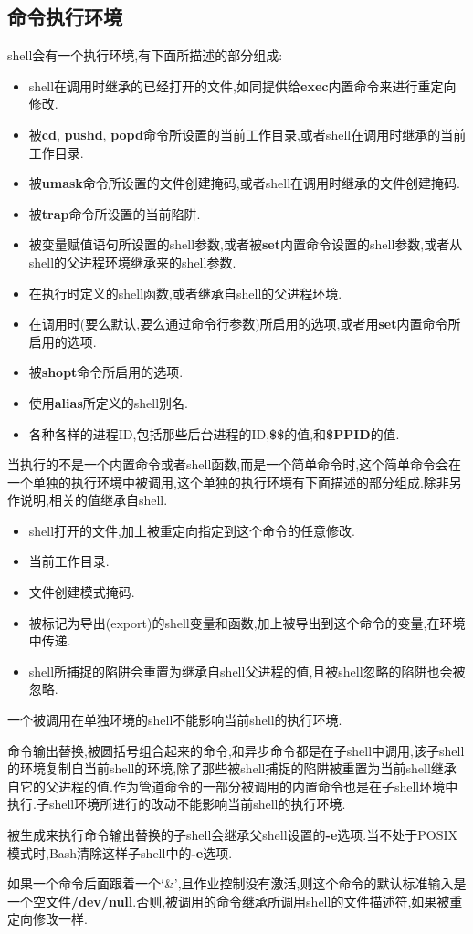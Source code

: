 \documentclass[draft,openany]{book}
\begin{document}
\begin{CJK}{UTF8}{gbsn}
    \subsection{命令执行环境}
    shell会有一个执行环境,有下面所描述的部分组成:
    \begin{itemize}
        \item shell在调用时继承的已经打开的文件,如同提供给\textbf{exec}内置命令来进行重定向修改.
        \item 被\textbf{cd}, \textbf{pushd}, \textbf{popd}命令所设置的当前工作目录,或者shell在调用时继承的当前工作目录.
        \item 被\textbf{umask}命令所设置的文件创建掩码,或者shell在调用时继承的文件创建掩码.
        \item 被\textbf{trap}命令所设置的当前陷阱.
        \item 被变量赋值语句所设置的shell参数,或者被\textbf{set}内置命令设置的shell参数,或者从shell的父进程环境继承来的shell参数.
        \item 在执行时定义的shell函数,或者继承自shell的父进程环境.
        \item 在调用时(要么默认,要么通过命令行参数)所启用的选项,或者用\textbf{set}内置命令所启用的选项.
        \item 被\textbf{shopt}命令所启用的选项.
        \item 使用\textbf{alias}所定义的shell别名.
        \item 各种各样的进程ID,包括那些后台进程的ID,\textbf{\$\$}的值,和\textbf{\$PPID}的值.
    \end{itemize}
    当执行的不是一个内置命令或者shell函数,而是一个简单命令时,这个简单命令会在一个单独的执行环境中被调用,这个单独的执行环境有下面描述的部分组成.除非另作说明,相关的值继承自shell.
    \begin{itemize}
        \item shell打开的文件,加上被重定向指定到这个命令的任意修改.
        \item 当前工作目录.
        \item 文件创建模式掩码.
        \item 被标记为导出(export)的shell变量和函数,加上被导出到这个命令的变量,在环境中传递.
        \item shell所捕捉的陷阱会重置为继承自shell父进程的值,且被shell忽略的陷阱也会被忽略.
    \end{itemize}
    一个被调用在单独环境的shell不能影响当前shell的执行环境.\par
    命令输出替换,被圆括号组合起来的命令,和异步命令都是在子shell中调用,该子shell的环境复制自当前shell的环境,除了那些被shell捕捉的陷阱被重置为当前shell继承自它的父进程的值.作为管道命令的一部分被调用的内置命令也是在子shell环境中执行.子shell环境所进行的改动不能影响当前shell的执行环境.\par
    被生成来执行命令输出替换的子shell会继承父shell设置的\textbf{-e}选项.当不处于POSIX模式时,Bash清除这样子shell中的\textbf{-e}选项.\par
    如果一个命令后面跟着一个`\&',且作业控制没有激活,则这个命令的默认标准输入是一个空文件\textbf{/dev/null}.否则,被调用的命令继承所调用shell的文件描述符,如果被重定向修改一样.


\end{CJK}
\end{document}
